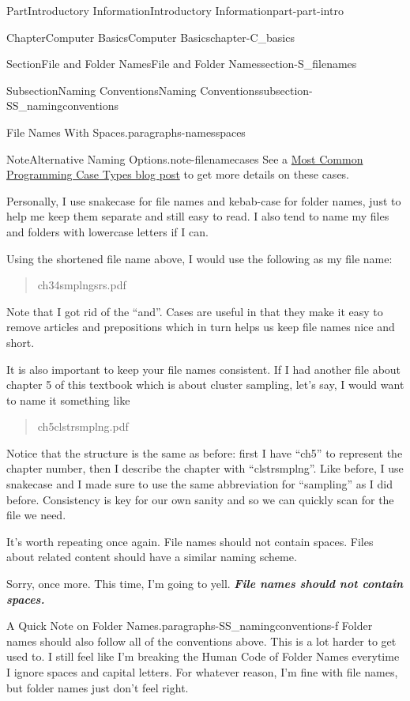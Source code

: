 \documentclass[twoside,10pt,]{book}
\newcommand{\alert}[1]{\textbf{\textit{#1}}}
\begin{document}
\begin{partptx}{Part}{Introductory Information}{}{Introductory Information}{}{}{part-part-intro}
\begin{chapterptx}{Chapter}{Computer Basics}{}{Computer Basics}{}{}{chapter-C_basics}
\begin{sectionptx}{Section}{File and Folder Names}{}{File and Folder Names}{}{}{section-S_filenames}
\begin{subsectionptx}{Subsection}{Naming Conventions}{}{Naming Conventions}{}{}{subsection-SS_namingconventions}
\begin{paragraphs}{File Names With Spaces.}{paragraphs-namesspaces}
\begin{note}{Note}{Alternative Naming Options.}{note-filenamecases}
See a \href{https://chaseadams.io/posts/most-common-programming-case-types/}{Most Common Programming Case Types blog post}\footnotemark{} to get more details on these cases.%
\end{note}
%
Personally, I use snake\textunderscore{}case for file names and kebab-case for folder names, just to help me keep them separate and still easy to read. I also tend to name my files and folders with lowercase letters if I can.%
\par
Using the shortened file name above, I would use the following as my file name:%
\begin{quote}%
ch3\textunderscore{}4\textunderscore{}smplng\textunderscore{}srs.pdf%
\end{quote}
Note that I got rid of the ``and''. Cases are useful in that they make it easy to remove articles and prepositions which in turn helps us keep file names nice and short.%
\par
It is also important to keep your file names consistent. If I had another file about chapter 5 of this textbook which is about cluster sampling, let's say, I would want to name it something like%
\begin{quote}%
ch5\textunderscore{}clstr\textunderscore{}smplng.pdf%
\end{quote}
Notice that the structure is the same as before: first I have ``ch5'' to represent the chapter number, then I describe the chapter with ``clstr\textunderscore{}smplng''. Like before, I use snake\textunderscore{}case and I made sure to use the same abbreviation for ``sampling'' as I did before. Consistency is key for our own sanity and so we can quickly scan for the file we need.%
\par
It's worth repeating once again. File names should not contain spaces. Files about related content should have a similar naming scheme.%
\par
Sorry, once more. This time, I'm going to yell. \alert{File names should not contain spaces.}%
\end{paragraphs}%
\begin{paragraphs}{A Quick Note on Folder Names.}{paragraphs-SS_namingconventions-f}%
%
%
Folder names should also follow all of the conventions above. This is a lot harder to get used to. I still feel like I'm breaking the Human Code of Folder Names everytime I ignore spaces and capital letters. For whatever reason, I'm fine with file names, but folder names just don't feel right.%

\end{paragraphs}
\end{subsectionptx}
\end{sectionptx}
\end{chapterptx}
\end{partptx}
\end{document}

